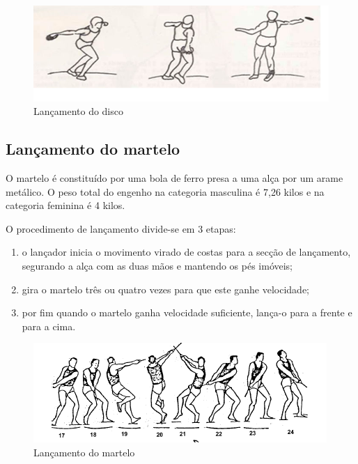 \documentclass{report}
\begin{document}
    \hfill \newline
     \FloatBarrier
            \begin{figure}[h]
            \center
            \includegraphics[scale=.4,angle=0]{disco.jpg}
            \caption{Lançamento do disco}
            \label{fig:disco.2}
            \end{figure}
            \FloatBarrier

   

    \subsection{Lançamento do martelo}
    O martelo é constituído por uma bola de ferro presa a uma alça por um arame metálico.
    O peso total do engenho na categoria masculina é 7,26 kilos e na categoria feminina é 4 kilos. \par
    O procedimento de lançamento divide-se em 3 etapas:
    \begin{enumerate}
        \item o lançador inicia o movimento virado de costas para a secção de lançamento, segurando a alça com as duas mãos e mantendo os pés imóveis;
        \item gira o martelo três ou quatro vezes para que este ganhe velocidade;
        \item por fim quando o martelo ganha velocidade suficiente, lança-o para a frente e para a cima.
    \end{enumerate} \cite{lancamentomartelo}
    
    \hfill \newline
     \FloatBarrier
            \begin{figure}[h]
            \center
            \includegraphics[scale=.5,angle=0]{martelo.png}
            \caption{Lançamento do martelo}
            \label{fig:martelo.2}
            \end{figure}
    \FloatBarrier
\end{document}
